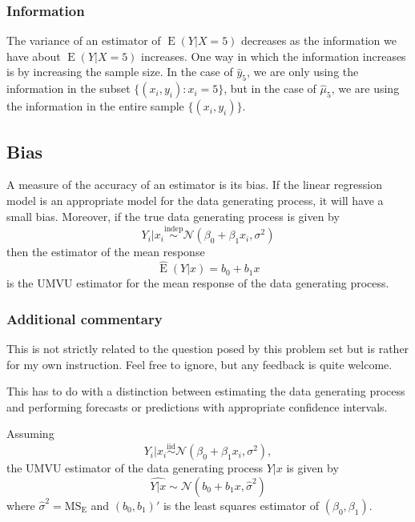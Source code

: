 \documentclass[
]{article}
\begin{document}
\hypertarget{information}{%
\subsubsection{Information}\label{information}}

The variance of an estimator of \(\operatorname{E}(Y|X=5)\) decreases as
the information we have about \(\operatorname{E}(Y|X=5)\) increases. One
way in which the information increases is by increasing the sample size.
In the case of \(\hat{y}_5\), we are only using the information in the
subset \(\{(x_i,y_i) : x_i = 5\}\), but in the case of \(\hat{\mu}_5\),
we are using the information in the entire sample \(\{(x_i,y_i)\}\).

\hypertarget{bias}{%
\subsection{Bias}\label{bias}}

A measure of the accuracy of an estimator is its bias. If the linear
regression model is an appropriate model for the data generating
process, it will have a small bias. Moreover, if the true data
generating process is given by \[
  Y_i | x_i \overset{\text{indep}}{\sim} \mathcal{N}(\beta_0 + \beta_1 x_i, \sigma^2)
\] then the estimator of the mean response \[
  \hat{\operatorname{E}}(Y|x) = b_0 + b_1 x
\] is the UMVU estimator for the mean response of the data generating
process.

\hypertarget{additional-commentary}{%
\subsubsection{Additional commentary}\label{additional-commentary}}

This is not strictly related to the question posed by this problem set
but is rather for my own instruction. Feel free to ignore, but any
feedback is quite welcome.

This has to do with a distinction between estimating the data generating
process and performing forecasts or predictions with appropriate
confidence intervals.

Assuming \[
  Y_i|x_i \overset{\text{iid}}{\sim} \mathcal{N}(\beta_0+\beta_1 x_i, \sigma^2),
\] the UMVU estimator of the data generating process \(Y|x\) is given by
\[
  \widehat{Y|x} \sim \mathcal{N}(b_0 + b_1 x, \hat{\sigma}^2)
\] where \(\hat{\sigma}^2 = \operatorname{MS_E}\) and \((b_0,b_1)'\) is
the least squares estimator of \((\beta_0,\beta_1)\).
\end{document}
